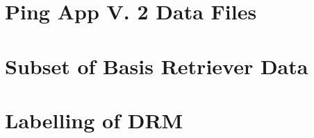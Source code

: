 \documentclass[12pt]{article} %
\begin{document}
\newpage
\begin{figure}[H]
 \centering 
 
\end{figure}

\newpage
\begin{figure}[H]
 \centering 
 
\end{figure}

\newpage
\begin{figure}[H]
 \centering 
 
\end{figure}

\newpage
\section{Ping App V. 2 Data Files} \label{sec:ping}
\begin{figure}[H]
 \centering 
 
\end{figure}

\newpage
\begin{figure}[H]
 \centering 
 
\end{figure}

\newpage
\begin{figure}[H]
 \centering 
 
\end{figure}

\newpage
\begin{figure}[H]
 \centering 
 
\end{figure}

\newpage
\begin{figure}[H]
 \centering 
 
\end{figure}

\newpage
\begin{figure}[H]
 \centering 
 
\end{figure}

\newpage
\section{Subset of Basis Retriever Data} \label{sec:subset}
\begin{figure}[H]
 \centering 
 
\end{figure}



\newpage
\section{Labelling of DRM} \label{sec:drm}


%
\end{document}
